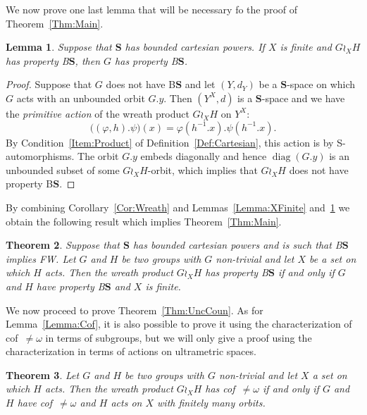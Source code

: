 \documentclass[a4paper]{article}
\newtheorem{lem}{Lemma}[section]
\newtheorem{thm}[lem]{Theorem}
\theoremstyle{definition}
\DeclareMathOperator\diag{diag}
\newcommand*{\BS}{B$\mathbf{S}$}
\begin{document}
We now prove one last lemma that will be necessary fo the proof of Theorem~\ref{Thm:Main}.
%
%
\begin{lem}\label{Lemma:Unboundedness}
Suppose that $\mathbf{S}$ has bounded cartesian powers. If $X$ is finite and $G\wr_XH$ has property \BS, then $G$ has property \BS.
\end{lem}
\begin{proof}
Suppose that $G$ does not have \BS{} and let $(Y,d_Y)$ be a $\mathbf S$-space on which $G$ acts with an unbounded orbit $G.y$.
Then $(Y^X,d)$ is a $\mathbf S$-space and we have the \emph{primitive action} of the wreath product $G\wr_XH$ on $Y^X$:
\[
	\bigl((\varphi,h).\psi\bigr)(x)=\varphi(h^{-1}.x).\psi(h^{-1}.x).
\]
By Condition~\ref{Item:Product} of Definition~\ref{Def:Cartesian}, this action is by S-automorphisms.
The orbit $G.y$ embeds diagonally and hence $\diag(G.y)$ is an unbounded subset of some $G\wr_XH$-orbit, which implies that $G\wr_XH$ does not have property \BS.
\end{proof}
%
%
By combining Corollary~\ref{Cor:Wreath} and Lemmas~\ref{Lemma:XFinite} and~\ref{Lemma:Unboundedness} we obtain the following result which implies Theorem~\ref{Thm:Main}.
%
%
\begin{thm}\label{Thm:Technic}
Suppose that $\mathbf{S}$ has bounded cartesian powers and is such that \BS{} implies FW.
Let $G$ and $H$ be two groups with $G$ non-trivial and let $X$ be a set on which $H$ acts. Then the wreath product $G \wr_X H$ has property \BS{} if and only if $G$ and $H$ have property \BS{} and $X$ is finite.
\end{thm}
%
%
We now proceed to prove Theorem~\ref{Thm:UncCoun}.
As for Lemma~\ref{Lemma:Cof}, it is also possible to prove it using the characterization of cof~$\neq\omega$ in terms of subgroups, but we will only give a proof using the characterization in terms of actions on ultrametric spaces.
%
%
\begin{thm}
Let $G$ and $H$ be two groups with $G$ non-trivial and let $X$ a set on which $H$ acts. Then the wreath product $G \wr_X H$ has cof~$\neq\omega$ if and only if $G$ and $H$ have cof~$\neq\omega$ and $H$ acts on $X$ with finitely many orbits.
\end{thm}
\end{document}
